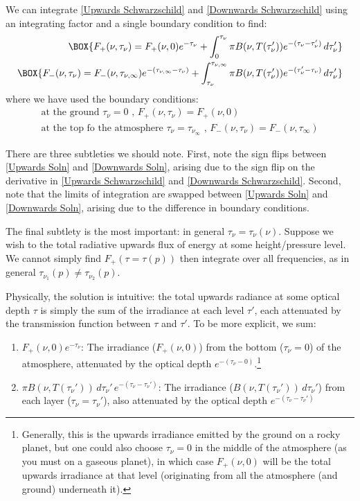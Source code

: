 We can integrate \ref{Upwards Schwarzschild} and \ref{Downwards Schwarzschild} using an integrating factor and a single boundary condition to find:
\begin{align}
    \BOX{F_+(\nu,\tau_\nu)=F_+(\nu,0)e^{-\tau_\nu}+\int_0^{\tau_\nu}\pi B(\nu,T(\tau_\nu'))e^{-(\tau_\nu-\tau_\nu')}\,d\tau_\nu'} \label{Upwards Soln}\\ 
    \BOX{F_-(\nu,\tau_\nu)=F_-(\nu,\tau_{\nu,\infty})e^{-(\tau_{\nu,\infty}-\tau_\nu)}+\int_{\tau_\nu}^{\tau_{\nu,\infty}}\pi B(\nu,T(\tau_\nu'))e^{-(\tau_\nu'-\tau_\nu)}\,d\tau_\nu'} \label{Downwards Soln}
\end{align}
where we have used the boundary conditions:
\begin{align*}
    \text{at the ground }\boxed{\tau_\nu=0\text{ , } F_+(\nu,\tau_\nu)=F_+(\nu,0)}\\
    \text{at the top fo the atmosphere }\boxed{\tau_\nu=\tau_{\nu_\infty}\text{ , } F_-(\nu,\tau_\nu)=F_-(\nu,\tau_{\infty})}
\end{align*}

There are three subtleties we should note. First, note the sign flips between \ref{Upwards Soln} and \ref{Downwards Soln}, arising due to the sign flip on the derivative in \ref{Upwards Schwarzschild} and \ref{Downwards Schwarzschild}. Second, note that the limits of integration are swapped between \ref{Upwards Soln} and \ref{Downwards Soln}, arising due to the difference in boundary conditions.

The final subtlety is the most important: in general $\tau_\nu=\tau_\nu(\nu)$. Suppose we wish to the total radiative upwards flux of energy at some height/pressure level. We cannot simply find $F_+(\tau=\tau(p))$ then integrate over all frequencies, as in general $\tau_{\nu_1}(p)\neq\tau_{\nu_2}(p)$.

Physically, the solution is intuitive: the total upwards radiance at some optical depth $\tau$ is simply the sum of the irradiance at each level $\tau'$, each attenuated by the transmission function between $\tau$ and $\tau'$. To be more explicit, we sum:
\begin{enumerate}
    \item $F_+(\nu,0)e^{-\tau_\nu}$: The irradiance ($F_+(\nu,0)$) from the bottom ($\tau_\nu=0$) of the atmosphere, attenuated by the optical depth $e^{-(\tau_\nu-0)}$.\footnote{Generally, this is the upwards irradiance emitted by the ground on a rocky planet, but one could also choose $\tau_\nu=0$ in the middle of the atmosphere (as you must on a gaseous planet), in which case $F_+(\nu,0)$ will be the total upwards irradiance at that level (originating from all the atmosphere (and ground) underneath it).}
    \item $\pi B(\nu,T(\tau_\nu'))\,d\tau_\nu'\,e^{-(\tau_\nu-\tau_\nu')}$: The irradiance ($B(\nu,T(\tau_\nu'))\,d\tau_\nu'$) from each layer ($\tau_\nu=\tau_\nu'$), also attenuated by the optical depth $e^{-(\tau_\nu-\tau_\nu')}$
\end{enumerate}

